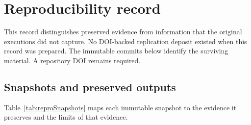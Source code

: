\documentclass[a4paper,11pt]{article}
\begin{document}
\section{Reproducibility record}

This record distinguishes preserved evidence from information that the original executions did not capture. No DOI-backed replication deposit existed when this record was prepared. The immutable commits below identify the surviving material. A repository DOI remains required.

\clearpage
\subsection{Snapshots and preserved outputs}

Table~\ref{tab:reproSnapshots} maps each immutable snapshot to the evidence it preserves and the limits of that evidence.
\end{document}
